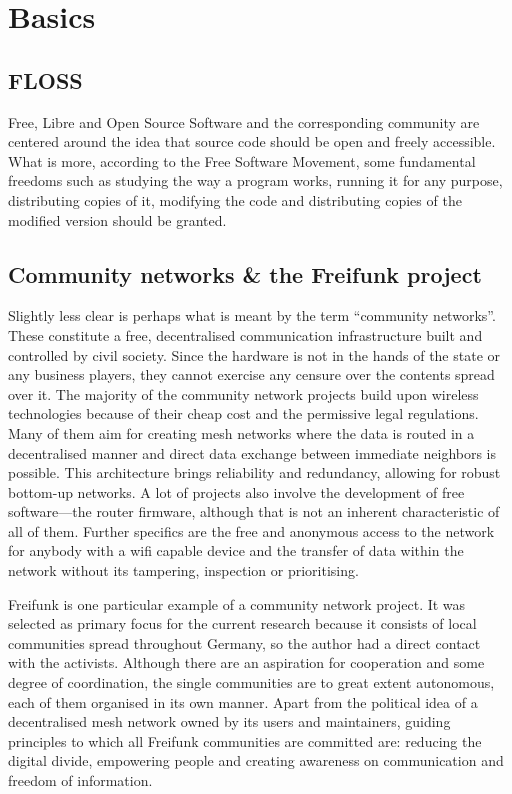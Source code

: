 \section{Basics}
\subsection{FLOSS}
Free, Libre and Open Source Software and the corresponding community are centered around the idea that source code should be open and freely accessible.
What is more, according to the Free Software Movement,
some fundamental freedoms such as studying the way a program works, running it for any purpose, distributing copies of it, modifying the code and distributing copies of the modified version should be granted\cite{gnuweb}.


\subsection{Community networks \& the Freifunk project}
Slightly less clear is perhaps what is meant by the term ``community networks''.
These constitute a free, decentralised communication infrastructure built and controlled by civil society.
Since the hardware is not in the hands of the state or any business players, they cannot exercise any censure over the contents spread over it. %
The majority of the community network projects build upon wireless technologies because of their cheap cost and the permissive legal regulations\cite{WNDW2013}\cite{Medosch2004}.
Many of them aim for creating mesh networks where the data is routed in a decentralised manner and direct data exchange between immediate neighbors is possible.
This architecture brings reliability and redundancy, allowing for robust bottom-up networks\cite{Medosch2004}.
A lot of projects also involve the development of free software---the router firmware, although that is not an inherent characteristic of all of them.
Further specifics are the free and anonymous access to the network for anybody with a wifi capable device and the transfer of data within the network without its tampering, inspection or prioritising\cite{ffweb}\cite{Medosch2004}. %

Freifunk is one particular example of a community network project.
It was selected as primary focus for the current research because it consists of local communities spread throughout Germany, so the author had a direct contact with the activists.
Although there are an aspiration for cooperation and some degree of coordination, the single communities are to great extent autonomous, each of them organised in its own manner.
Apart from the political idea of a decentralised mesh network owned by its users and maintainers, guiding principles to which all Freifunk communities are committed are: reducing the digital divide, empowering people and creating awareness on communication and freedom of information\cite{ffweb}.

